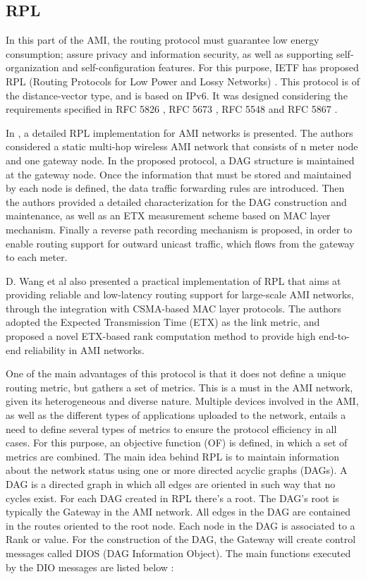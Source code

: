\documentclass[11pt,draftclsnofoot,onecolumn]{IEEEtran}
\begin{document}
\subsection{RPL}\label{rpl}

In this part of the AMI, the routing protocol must guarantee low energy consumption; assure privacy and information security, as well as supporting self-organization and self-configuration features. For this purpose, IETF has proposed RPL (Routing Protocols for Low Power and Lossy Networks)  \cite{Winter2012}. This protocol is of the distance-vector type, and is based on IPv6. It was designed considering the requirements specified in RFC 5826 \cite{Brandt2010}, RFC 5673 \cite{Pister2009}, RFC 5548 \cite{Dohler2009} and RFC 5867 \cite{Martocci2010}. 

In \cite{Wang2010} , a detailed RPL implementation for AMI networks is presented. The authors considered a static multi-hop wireless AMI network that consists of n meter node and one gateway node. In the proposed protocol, a DAG structure is maintained at the gateway node. Once the information that must be stored and maintained by each node is defined, the data traffic forwarding rules are introduced. Then the authors provided a detailed characterization for the DAG construction and maintenance, as well as an ETX measurement scheme based on MAC layer mechanism. Finally a reverse path recording mechanism is proposed, in order to enable routing support for outward unicast traffic, which flows from the gateway to each meter. 

D. Wang et al \cite{Wang2010} also presented a practical implementation of RPL that aims at providing reliable and low-latency routing support for large-scale AMI networks, through the integration with CSMA-based MAC layer protocols. The authors adopted the Expected Transmission Time (ETX) as the link metric, and proposed a novel ETX-based rank computation method to provide high end-to-end reliability in AMI networks. 

One of the main advantages of this protocol is that it does not define a unique routing metric, but gathers a set of metrics. This is a must in the AMI network, given its heterogeneous and diverse nature. Multiple devices involved in the AMI, as well as the different types of applications uploaded to the network, entails a need to define several types of metrics to ensure the protocol efficiency in all cases. For this purpose, an objective function (OF) is defined, in which a set of metrics are combined. 
The main idea behind RPL is to maintain information about the network status using one or more directed acyclic graphs (DAGs). A DAG is a directed graph in which all edges are oriented in such way that no cycles exist. For each DAG created in RPL there’s a root. The DAG’s root is typically the Gateway in the AMI network. All edges in the DAG are contained in the routes oriented to the root node. Each node in the DAG is associated to a Rank or value. For the construction of the DAG, the Gateway will create control messages called DIOS (DAG Information Object). The main functions executed by the DIO messages are listed below  \cite{Iyer2011a}:
\end{document}
